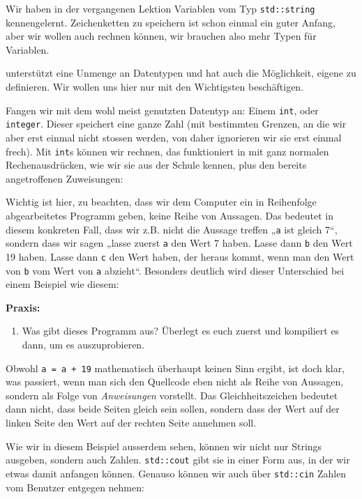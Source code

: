 
Wir haben in der vergangenen Lektion Variablen vom Typ \texttt{std::string}
kennengelernt. Zeichenketten zu speichern ist schon einmal ein guter Anfang,
aber wir wollen auch rechnen können, wir brauchen also mehr Typen für
Variablen.

\Cpp unterstützt eine Unmenge an Datentypen und hat auch die Möglichkeit,
eigene zu definieren. Wir wollen uns hier nur mit den Wichtigsten beschäftigen.

Fangen wir mit dem wohl meist genutzten Datentyp an: Einem \texttt{int}, oder
\texttt{integer}. Dieser speichert eine ganze Zahl (mit bestimmten Grenzen, an
die wir aber erst einmal nicht stossen werden, von daher ignorieren wir sie
erst einmal frech). Mit \texttt{int}s können wir rechnen, das funktioniert in
\Cpp mit ganz normalen Rechenausdrücken, wie wir sie aus der Schule kennen,
plus den bereits angetroffenen Zuweisungen:


Wichtig ist hier, zu beachten, dass wir dem Computer ein in Reihenfolge
abgearbeitetes Programm geben, keine Reihe von Aussagen. Das bedeutet in diesem
konkreten Fall, dass wir z.B. nicht die Aussage treffen „\texttt{a} ist gleich
7“, sondern dass wir sagen „lasse zuerst \texttt{a} den Wert 7 haben. Lasse
dann \texttt{b} den Wert 19 haben. Lasse dann \texttt{c} den Wert haben, der
heraus kommt, wenn man den Wert von \texttt{b} vom Wert von \texttt{a}
abzieht“. Besonders deutlich wird dieser Unterschied bei einem Beispiel wie
diesem:


\textbf{Praxis:}
\begin{enumerate}
    \item Was gibt dieses Programm aus? Überlegt es euch zuerst und kompiliert
        es dann, um es auszuprobieren.
\end{enumerate}

Obwohl \texttt{a = a + 19} mathematisch überhaupt keinen Sinn ergibt, ist doch
klar, was passiert, wenn man sich den Quellcode eben nicht als Reihe von
Aussagen, sondern als Folge von \emph{Anweisungen} vorstellt. Das
Gleichheitszeichen bedeutet dann nicht, dass beide Seiten gleich sein sollen,
sondern dass der Wert auf der linken Seite den Wert auf der rechten Seite
annehmen soll.

Wie wir in diesem Beispiel ausserdem sehen, können wir nicht nur Strings
ausgeben, sondern auch Zahlen. \texttt{std::cout} gibt sie in einer Form aus,
in der wir etwas damit anfangen können. Genauso können wir auch über
\texttt{std::cin} Zahlen vom Benutzer entgegen nehmen:

